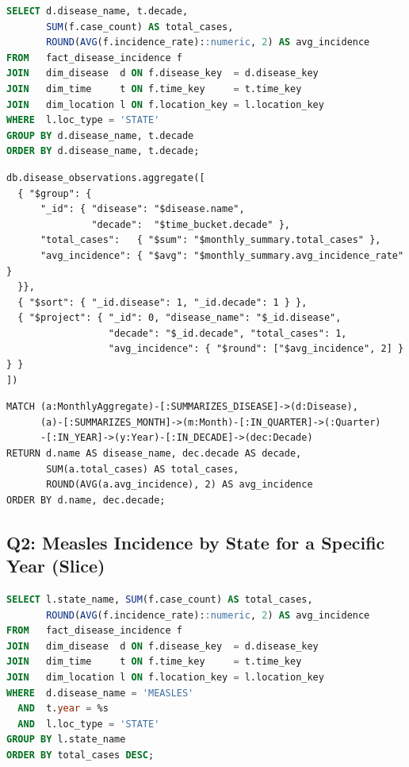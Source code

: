 \documentclass[12pt,a4paper]{article}
\begin{document}
\begin{lstlisting}[language=SQL, caption={Q1: PostgreSQL.}]
SELECT d.disease_name, t.decade,
       SUM(f.case_count) AS total_cases,
       ROUND(AVG(f.incidence_rate)::numeric, 2) AS avg_incidence
FROM   fact_disease_incidence f
JOIN   dim_disease  d ON f.disease_key  = d.disease_key
JOIN   dim_time     t ON f.time_key     = t.time_key
JOIN   dim_location l ON f.location_key = l.location_key
WHERE  l.loc_type = 'STATE'
GROUP BY d.disease_name, t.decade
ORDER BY d.disease_name, t.decade;
\end{lstlisting}

\begin{lstlisting}[language={}, caption={Q1: MongoDB.}]
db.disease_observations.aggregate([
  { "$group": {
      "_id": { "disease": "$disease.name",
               "decade":  "$time_bucket.decade" },
      "total_cases":   { "$sum": "$monthly_summary.total_cases" },
      "avg_incidence": { "$avg": "$monthly_summary.avg_incidence_rate" }
  }},
  { "$sort": { "_id.disease": 1, "_id.decade": 1 } },
  { "$project": { "_id": 0, "disease_name": "$_id.disease",
                  "decade": "$_id.decade", "total_cases": 1,
                  "avg_incidence": { "$round": ["$avg_incidence", 2] } } }
])
\end{lstlisting}

\begin{lstlisting}[language=cypher, caption={Q1: Neo4j.}]
MATCH (a:MonthlyAggregate)-[:SUMMARIZES_DISEASE]->(d:Disease),
      (a)-[:SUMMARIZES_MONTH]->(m:Month)-[:IN_QUARTER]->(:Quarter)
      -[:IN_YEAR]->(y:Year)-[:IN_DECADE]->(dec:Decade)
RETURN d.name AS disease_name, dec.decade AS decade,
       SUM(a.total_cases) AS total_cases,
       ROUND(AVG(a.avg_incidence), 2) AS avg_incidence
ORDER BY d.name, dec.decade;
\end{lstlisting}


\subsection*{Q2: Measles Incidence by State for a Specific Year (Slice)}

\begin{lstlisting}[language=SQL, caption={Q2: PostgreSQL.}]
SELECT l.state_name, SUM(f.case_count) AS total_cases,
       ROUND(AVG(f.incidence_rate)::numeric, 2) AS avg_incidence
FROM   fact_disease_incidence f
JOIN   dim_disease  d ON f.disease_key  = d.disease_key
JOIN   dim_time     t ON f.time_key     = t.time_key
JOIN   dim_location l ON f.location_key = l.location_key
WHERE  d.disease_name = 'MEASLES'
  AND  t.year = %s
  AND  l.loc_type = 'STATE'
GROUP BY l.state_name
ORDER BY total_cases DESC;
\end{lstlisting}
\end{document}
